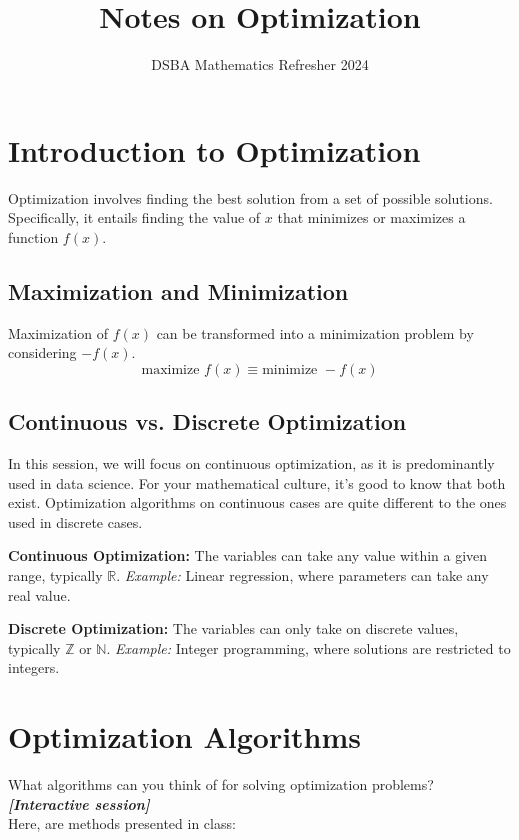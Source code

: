 \documentclass[]{article}
\title{Notes on Optimization}
\author{DSBA Mathematics Refresher 2024}
\date{}
\newcommand{\N}{\mathbb{N}}
\newcommand{\Z}{\mathbb{Z}}
\newcommand{\R}{\mathbb{R}}
\begin{document}
	
	\maketitle
	
	\begin{abstract}
		
	\end{abstract}
	
	\section*{Introduction to Optimization}
	Optimization involves finding the best solution from a set of possible solutions.
	Specifically, it entails finding the value of $x$ that minimizes or maximizes a function $f(x)$.
	
	\subsection*{Maximization and Minimization}
	Maximization of $f(x)$ can be transformed into a minimization problem by considering $-f(x)$.
	$$\text{maximize } f(x) \equiv \text{minimize } -f(x)$$
	
	\subsection*{Continuous vs. Discrete Optimization}
	In this session, we will focus on continuous optimization, as it is predominantly used in data science.
	For your mathematical culture, it's good to know that both exist.
	Optimization algorithms on continuous cases are quite different to the ones used in discrete cases.
	
	\textbf{Continuous Optimization:}
	The variables can take any value within a given range, typically $\R$.
	\textit{Example:} Linear regression, where parameters can take any real value.
	
	\textbf{Discrete Optimization:}
	The variables can only take on discrete values, typically $\Z$ or $\N$.
	\textit{Example:} Integer programming, where solutions are restricted to integers.
	
	\section*{Optimization Algorithms}
	What algorithms can you think of for solving optimization problems?\\
	\textbf{\textit{[Interactive session]}}\\
	Here, are methods presented in class:
	
\end{document}
